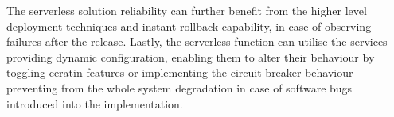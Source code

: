 The serverless solution reliability can further benefit from the higher level deployment techniques and instant rollback capability, in case of observing failures after the release. Lastly, the serverless function can utilise the services providing dynamic configuration, enabling them to alter their behaviour by toggling ceratin features or implementing the circuit breaker behaviour preventing from the whole system degradation in case of software bugs introduced into the implementation.








